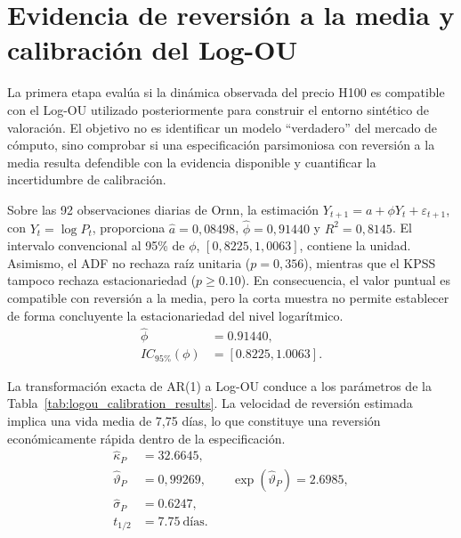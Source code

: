 \section{Evidencia de reversión a la media y calibración del Log-OU}
\label{sec:results_logou}

La primera etapa evalúa si la dinámica observada del precio H100 es compatible con el
Log-OU utilizado posteriormente para construir el entorno sintético de valoración. El
objetivo no es identificar un modelo ``verdadero'' del mercado de cómputo, sino comprobar
si una especificación parsimoniosa con reversión a la media resulta defendible con la
evidencia disponible y cuantificar la incertidumbre de calibración.

Sobre las 92 observaciones diarias de Ornn, la estimación
$Y_{t+1}=a+\phi Y_t+\varepsilon_{t+1}$, con $Y_t=\log P_t$, proporciona
$\widehat a=0{,}08498$, $\widehat\phi=0{,}91440$ y $R^2=0{,}8145$. El intervalo
convencional al 95\% de $\phi$, $[0{,}8225,1{,}0063]$, contiene la unidad.
Asimismo, el ADF no rechaza raíz unitaria ($p=0{,}356$), mientras que el KPSS
tampoco rechaza estacionariedad ($p\geq0.10$). En consecuencia, el valor puntual es
compatible con reversión a la media, pero la corta muestra no permite establecer de forma
concluyente la estacionariedad del nivel logarítmico.
\begin{align}
    \widehat\phi &= 0.91440, \label{eq:result_phi}\\
    IC_{95\%}(\phi) &= [0.8225,1.0063]. \label{eq:phi_ci}
\end{align}

La transformación exacta de AR(1) a Log-OU conduce a los parámetros de la
Tabla~\ref{tab:logou_calibration_results}. La velocidad de reversión estimada implica una
vida media de 7{,}75 días, lo que constituye una reversión económicamente rápida dentro de
la especificación.
\begin{align}
    \widehat\kappa_P &= 32.6645, \label{eq:result_kappa}\\
    \widehat\vartheta_P &= 0{,}99269,\qquad
    \exp(\widehat\vartheta_P)=2.6985, \label{eq:result_long_run_level}\\
    \widehat\sigma_P &= 0.6247, \label{eq:result_sigma}\\
    t_{1/2} &= 7.75\ \text{días}. \label{eq:result_half_life}
\end{align}

